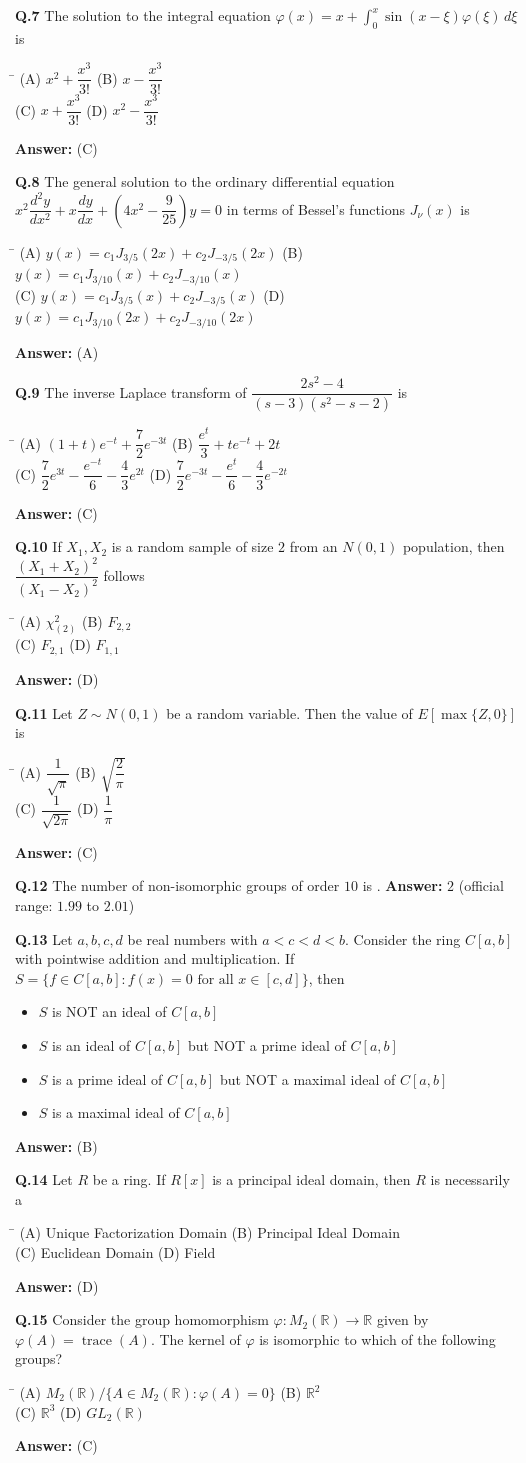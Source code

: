 \documentclass[11pt,a4paper]{article}
\newcommand{\optsfourA}[4]{%
  \begin{tabbing}
    \hspace{0.48\linewidth}\=\kill
    (A) #1 \> (B) #2 \\[2pt]
    (C) #3 \> (D) #4
  \end{tabbing}%
}
\newcommand{\optslistA}[4]{%
  \begin{itemize}
    \setlength{\itemsep}{2pt}\setlength{\parskip}{0pt}
    \item[(A)] #1
    \item[(B)] #2
    \item[(C)] #3
    \item[(D)] #4
  \end{itemize}%
}
\newcommand{\ans}[1]{\textbf{Answer:} #1\par\medskip}
\begin{document}
\textbf{Q.7} The solution to the integral equation $\varphi(x) = x + \displaystyle\int_0^x \sin(x - \xi)\varphi(\xi)\,d\xi$ is
\optsfourA{$x^2 + \dfrac{x^3}{3!}$}{$x - \dfrac{x^3}{3!}$}{$x + \dfrac{x^3}{3!}$}{$x^2 - \dfrac{x^3}{3!}$}
\ans{(C)}

\textbf{Q.8} The general solution to the ordinary differential equation $x^2\dfrac{d^2 y}{dx^2} + x\dfrac{dy}{dx} + \left(4x^2 - \dfrac{9}{25}\right)y = 0$ in terms of Bessel's functions $J_\nu(x)$ is
\optsfourA{$y(x) = c_1 J_{3/5}(2x) + c_2 J_{-3/5}(2x)$}{$y(x) = c_1 J_{3/10}(x) + c_2 J_{-3/10}(x)$}{$y(x) = c_1 J_{3/5}(x) + c_2 J_{-3/5}(x)$}{$y(x) = c_1 J_{3/10}(2x) + c_2 J_{-3/10}(2x)$}
\ans{(A)}

\textbf{Q.9} The inverse Laplace transform of $\dfrac{2s^2 - 4}{(s - 3)(s^2 - s - 2)}$ is
\optsfourA{$(1 + t)e^{-t} + \dfrac{7}{2}e^{-3t}$}{$\dfrac{e^t}{3} + te^{-t} + 2t$}{$\dfrac{7}{2}e^{3t} - \dfrac{e^{-t}}{6} - \dfrac{4}{3}e^{2t}$}{$\dfrac{7}{2}e^{-3t} - \dfrac{e^t}{6} - \dfrac{4}{3}e^{-2t}$}
\ans{(C)}

\textbf{Q.10} If $X_1, X_2$ is a random sample of size $2$ from an $N(0, 1)$ population, then $\dfrac{(X_1 + X_2)^2}{(X_1 - X_2)^2}$ follows
\optsfourA{$\chi_{(2)}^2$}{$F_{2, 2}$}{$F_{2, 1}$}{$F_{1, 1}$}
\ans{(D)}

\textbf{Q.11} Let $Z \sim N(0, 1)$ be a random variable. Then the value of $E[\max\{Z, 0\}]$ is
\optsfourA{$\dfrac{1}{\sqrt{\pi}}$}{$\sqrt{\dfrac{2}{\pi}}$}{$\dfrac{1}{\sqrt{2\pi}}$}{$\dfrac{1}{\pi}$}
\ans{(C)}

\textbf{Q.12} The number of non-isomorphic groups of order $10$ is \underline{\hspace{2cm}}.
\ans{$2$ (official range: $1.99$ to $2.01$)}

\textbf{Q.13} Let $a, b, c, d$ be real numbers with $a < c < d < b$. Consider the ring $C[a, b]$ with pointwise addition and multiplication. If $S = \{f \in C[a, b] : f(x) = 0 \text{ for all } x \in [c, d]\}$, then
\optslistA{$S$ is NOT an ideal of $C[a, b]$}{$S$ is an ideal of $C[a, b]$ but NOT a prime ideal of $C[a, b]$}{$S$ is a prime ideal of $C[a, b]$ but NOT a maximal ideal of $C[a, b]$}{$S$ is a maximal ideal of $C[a, b]$}
\ans{(B)}

\textbf{Q.14} Let $R$ be a ring. If $R[x]$ is a principal ideal domain, then $R$ is necessarily a
\optsfourA{Unique Factorization Domain}{Principal Ideal Domain}{Euclidean Domain}{Field}
\ans{(D)}

\textbf{Q.15} Consider the group homomorphism $\varphi : M_2(\mathbb{R}) \to \mathbb{R}$ given by $\varphi(A) = \operatorname{trace}(A)$. The kernel of $\varphi$ is isomorphic to which of the following groups?
\optsfourA{$M_2(\mathbb{R}) / \{A \in M_2(\mathbb{R}) : \varphi(A) = 0\}$}{$\mathbb{R}^2$}{$\mathbb{R}^3$}{$GL_2(\mathbb{R})$}
\ans{(C)}
\end{document}
